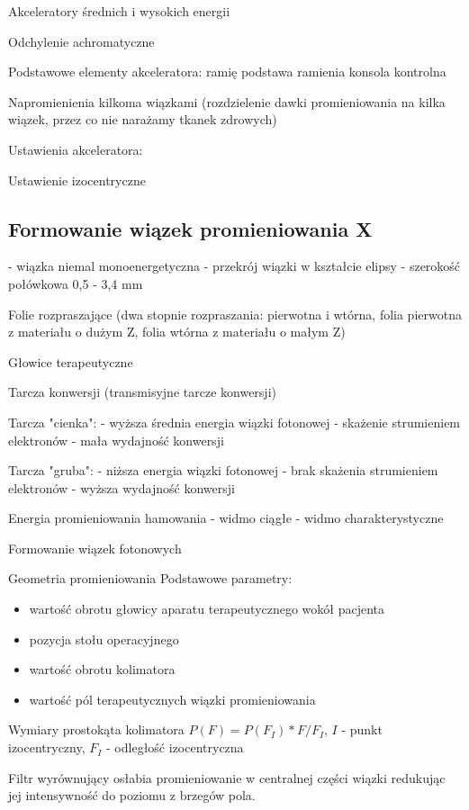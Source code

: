 \documentclass{article}
\begin{document}
Akceleratory średnich i wysokich energii

Odchylenie achromatyczne

Podstawowe elementy akceleratora:
ramię
podstawa ramienia
konsola kontrolna

Napromienienia kilkoma wiązkami (rozdzielenie dawki promieniowania na kilka wiązek, przez co nie narażamy tkanek zdrowych)

Ustawienia akceleratora:

Ustawienie izocentryczne

\subsection{Formowanie wiązek promieniowania X}

- wiązka niemal monoenergetyczna
- przekrój wiązki w kształcie elipsy
- szerokość połówkowa 0,5 - 3,4 mm

Folie rozpraszające (dwa stopnie rozpraszania: pierwotna i wtórna, folia pierwotna z materiału o dużym Z, folia wtórna z materiału o małym Z)

Głowice terapeutyczne

Tarcza konwersji (transmisyjne tarcze konwersji)

Tarcza "cienka":
- wyższa średnia energia wiązki fotonowej
- skażenie strumieniem elektronów
- mała wydajność konwersji

Tarcza "gruba":
- niższa energia wiązki fotonowej
- brak skażenia strumieniem elektronów
- wyższa wydajność konwersji

Energia promieniowania hamowania
- widmo ciągłe
- widmo charakterystyczne

Formowanie wiązek fotonowych

Geometria promieniowania
Podstawowe parametry:
\begin{itemize}
    \item wartość obrotu głowicy aparatu terapeutycznego wokół pacjenta
    \item pozycja stołu operacyjnego
    \item wartość obrotu kolimatora
    \item wartość pól terapeutycznych wiązki promieniowania
\end{itemize}

Wymiary prostokąta kolimatora $P(F) = P(F_I)*F/F_I$, $I$ - punkt izocentryczny, $F_I$ - odległość izocentryczna

Filtr wyrównujący osłabia promieniowanie w centralnej części wiązki redukując jej intensywność do poziomu z brzegów pola.
\end{document}
